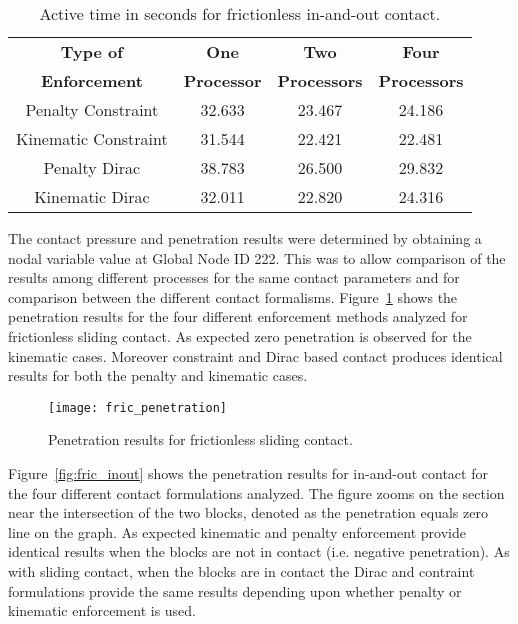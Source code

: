 \documentclass[]{article}
\begin{document}
\begin{table}[!h]
\caption{Active time in seconds for frictionless in-and-out contact.}
\centering
\begin{tabular}{cccc}
\hline
\textbf{Type of} & \textbf{One} & \textbf{Two} & \textbf{Four} \\
\textbf{Enforcement}  & \textbf{Processor} & \textbf{Processors} & \textbf{Processors}\\
\hline
Penalty Constraint & 32.633 & 23.467 & 24.186 \\
Kinematic Constraint & 31.544 & 22.421 & 22.481 \\
Penalty Dirac  & 38.783 & 26.500 & 29.832 \\
Kinematic Dirac & 32.011 & 22.820 & 24.316 \\
\hline
\end{tabular}
\label{table:finc_active}
\end{table}

\noindent The contact pressure and penetration results were determined by obtaining a nodal variable value at Global Node ID 222.  This was to allow comparison of the results among different processes for the same contact parameters and for comparison between the different contact formalisms. Figure~\ref{fig:fric_penetration}  shows the penetration results for the four different enforcement methods analyzed for frictionless sliding contact.  As expected zero penetration is observed for the kinematic cases.  Moreover constraint and Dirac based contact produces identical results for both the penalty and kinematic cases.

\begin{figure}[H]
   \centering
   \texttt{[image: fric\_penetration]}
   \caption{Penetration results for frictionless sliding contact.}
   \label{fig:fric_penetration}
\end{figure}

\noindent Figure~\ref{fig:fric_inout} shows the penetration results for in-and-out contact for the four different contact formulations analyzed.  The figure zooms on the section near the intersection of the two blocks, denoted as the penetration equals zero line on the graph.  As expected kinematic and penalty enforcement provide identical results when the blocks are not in contact (i.e. negative penetration).  As with sliding contact, when the blocks are in contact the Dirac and contraint formulations provide the same results depending upon whether penalty or kinematic enforcement is used.
\end{document}
